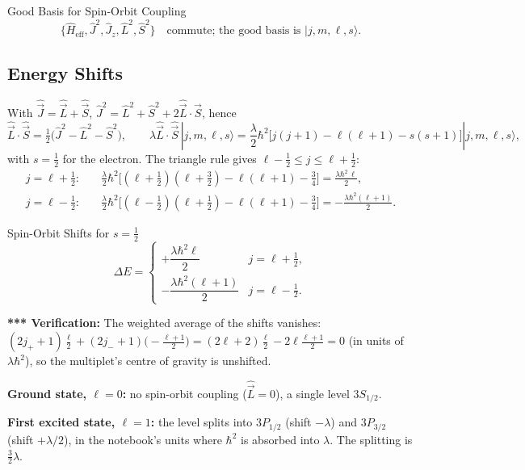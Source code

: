 \documentclass[11pt,a4paper]{article}
\begin{document}
\begin{thm}{Good Basis for Spin-Orbit Coupling}
\[
\{\hat H_{\mathrm{eff}},\hat J^2,\hat J_z,\hat L^2,\hat S^2\}\quad\text{commute; the good basis is }|j,m,\ell,s\rangle.
\]
\end{thm}

\subsection{Energy Shifts}
With $\hat{\vec J}=\hat{\vec L}+\hat{\vec S}$, $\hat J^2=\hat L^2+\hat S^2+2\hat{\vec L}\cdot\hat{\vec S}$, hence
\[
\hat{\vec L}\cdot\hat{\vec S}=\tfrac12\big(\hat J^2-\hat L^2-\hat S^2\big),\qquad
\lambda\hat{\vec L}\cdot\hat{\vec S}\,|j,m,\ell,s\rangle=\frac\lambda2\hbar^2\big[j(j+1)-\ell(\ell+1)-s(s+1)\big]|j,m,\ell,s\rangle,
\]
with $s=\tfrac12$ for the electron. The triangle rule gives $\ell-\tfrac12\le j\le\ell+\tfrac12$:
\begin{align*}
j=\ell+\tfrac12:&\quad\frac\lambda2\hbar^2\Big[(\ell+\tfrac12)(\ell+\tfrac32)-\ell(\ell+1)-\tfrac34\Big]=\frac{\lambda\hbar^2\,\ell}2,\\
j=\ell-\tfrac12:&\quad\frac\lambda2\hbar^2\Big[(\ell-\tfrac12)(\ell+\tfrac12)-\ell(\ell+1)-\tfrac34\Big]=-\frac{\lambda\hbar^2(\ell+1)}2 .
\end{align*}

\begin{thm}{Spin-Orbit Shifts for $s=\tfrac12$}
\[
\Delta E=\begin{cases}+\dfrac{\lambda\hbar^2\ell}2&j=\ell+\tfrac12,\\[6pt]-\dfrac{\lambda\hbar^2(\ell+1)}2&j=\ell-\tfrac12.\end{cases}
\]
\end{thm}

\textbf{*** Verification:} The weighted average of the shifts vanishes: $(2j_++1)\frac{\ell}2+(2j_-+1)\big(-\frac{\ell+1}2\big)=(2\ell+2)\frac\ell2-2\ell\frac{\ell+1}2=0$ (in units of $\lambda\hbar^2$), so the multiplet's centre of gravity is unshifted.

\textbf{Ground state, $\ell=0$:} no spin-orbit coupling ($\hat{\vec L}=0$), a single level $3S_{1/2}$.

\textbf{First excited state, $\ell=1$:} the level splits into $3P_{1/2}$ (shift $-\lambda$) and $3P_{3/2}$ (shift $+\lambda/2$), in the notebook's units where $\hbar^2$ is absorbed into $\lambda$. The splitting is $\tfrac32\lambda$.
\end{document}
